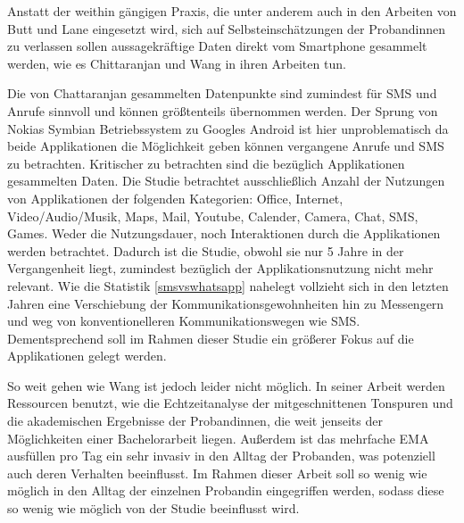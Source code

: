Anstatt der weithin gängigen Praxis, die unter anderem auch in den Arbeiten von Butt \cite{butt2008personality} und Lane \cite{lane2011impact}
eingesetzt wird, sich auf Selbsteinschätzungen der Probandinnen zu verlassen sollen aussagekräftige Daten direkt vom Smartphone gesammelt werden, 
wie es Chittaranjan \cite{chittaranjan2011s} und Wang \cite{wang2014istudentlife} in ihren Arbeiten tun.
\par
Die von Chattaranjan gesammelten Datenpunkte sind zumindest für SMS und Anrufe sinnvoll und können größtenteils übernommen werden.
Der Sprung von Nokias Symbian Betriebssystem zu Googles Android ist hier unproblematisch da beide Applikationen die Möglichkeit geben können
vergangene Anrufe und SMS zu betrachten.
Kritischer zu betrachten sind die bezüglich Applikationen gesammelten Daten.
Die Studie betrachtet ausschließlich Anzahl der Nutzungen von Applikationen der folgenden Kategorien:
Office, Internet, Video/Audio/Musik, Maps, Mail, Youtube, Calender, Camera, Chat, SMS, Games.
Weder die Nutzungsdauer, noch Interaktionen durch die Applikationen werden betrachtet. 
Dadurch ist die Studie, obwohl sie nur 5 Jahre in der Vergangenheit liegt, zumindest bezüglich der Applikationsnutzung nicht mehr relevant.
Wie die Statistik \ref{smsvswhatsapp} nahelegt vollzieht sich in den letzten Jahren eine Verschiebung der Kommunikationsgewohnheiten hin zu Messengern und weg von konventionelleren Kommunikationswegen wie SMS.
Dementsprechend soll im Rahmen dieser Studie ein größerer Fokus auf die Applikationen gelegt werden.
\par
So weit gehen wie Wang ist jedoch leider nicht möglich.
In seiner Arbeit werden Ressourcen benutzt, wie die Echtzeitanalyse der mitgeschnittenen Tonspuren und die akademischen Ergebnisse der Probandinnen, die weit jenseits der Möglichkeiten einer Bachelorarbeit liegen.
Außerdem ist das mehrfache EMA ausfüllen pro Tag ein sehr invasiv in den Alltag der Probanden, was potenziell auch deren Verhalten beeinflusst.
Im Rahmen dieser Arbeit soll so wenig wie möglich in den Alltag der einzelnen Probandin eingegriffen werden, sodass diese so wenig wie möglich von der Studie beeinflusst wird.


